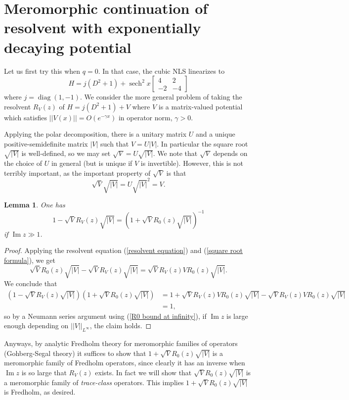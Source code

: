 \documentclass[reqno,12pt,letterpaper]{amsart}
\DeclareMathOperator{\diag}{diag}
\DeclareMathOperator{\sech}{sech}
\renewcommand{\Im}{\operatorname{Im}}
\newtheorem{lemma}[theorem]{Lemma}
\theoremstyle{definition}
\begin{document}
\section{Meromorphic continuation of resolvent with exponentially decaying potential}
Let us first try this when $q = 0$. In that case, the cubic NLS linearizes to
$$H = j(D^2 + 1) + \sech^2 x \begin{bmatrix} 4 & 2 \\ -2 & -4\end{bmatrix}$$
where $j = \diag(1, -1)$. We consider the more general problem of taking the resolvent $R_V(z)$ of $H = j(D^2 + 1) + V$ where $V$ is a matrix-valued potential which satisfies $||V(x)|| = O(e^{-\gamma x})$ in operator norm, $\gamma > 0$.

Applying the polar decomposition, there is a unitary matrix $U$ and a unique positive-semidefinite matrix $|V|$ such that $V = U|V|$.
In particular the square root $\sqrt{|V|}$ is well-defined, so we may set $\sqrt V = U\sqrt{|V|}$.
We note that $\sqrt V$ depends on the choice of $U$ in general (but is unique if $V$ is invertible).
However, this is not terribly important, as the important property of $\sqrt V$ is that
\begin{equation}
\label{square root formula}
\sqrt V \sqrt{|V|} = U \sqrt{|V|}^2 = V.
\end{equation}

\begin{lemma}
One has
$$1 - \sqrt V R_V(z) \sqrt{|V|} = (1 + \sqrt V R_0(z) \sqrt{|V|})^{-1}$$
if $\Im z \gg 1$.
\end{lemma}
\begin{proof}
Applying the resolvent equation (\ref{resolvent equation}) and (\ref{square root formula}), we get
$$\sqrt V R_0(z) \sqrt{|V|} - \sqrt V R_V(z) \sqrt{|V|} = \sqrt V R_V(z) V R_0(z) \sqrt{|V|}.$$
We conclude that
\begin{align*}
(1 - \sqrt V R_V(z) \sqrt{|V|})(1 + \sqrt V R_0(z)\sqrt{|V|}) &= 1 + \sqrt V R_V(z) V R_0(z)\sqrt{|V|} - \sqrt V R_V(z) V R_0(z)\sqrt{|V|} \\
&= 1,
\end{align*}
so by a Neumann series argument using (\ref{R0 bound at infinity}), if $\Im z$ is large enough depending on $||V||_{L^\infty}$, the claim holds.
\end{proof}

Anyways, by analytic Fredholm theory for meromorphic families of operators (Gohberg-Segal theory) it suffices to show that $1 + \sqrt V R_0(z) \sqrt{|V|}$ is a meromorphic family of Fredholm operators, since clearly it has an inverse when $\Im z$ is so large that $R_V(z)$ exists.
In fact we will show that $\sqrt V R_0(z) \sqrt{|V|}$ is a meromorphic family of \emph{trace-class} operators.
This implies $1 + \sqrt V R_0(z) \sqrt{|V|}$ is Fredholm, as desired.
\end{document}
